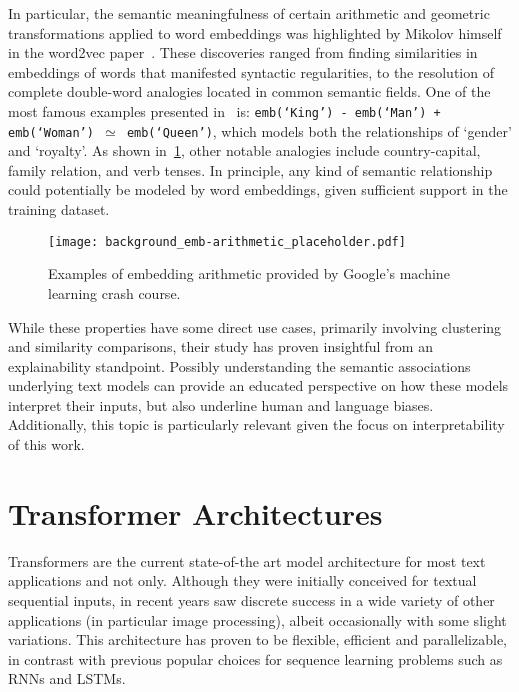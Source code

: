 In particular, the semantic meaningfulness of certain arithmetic and geometric transformations applied to word embeddings was highlighted by Mikolov himself in the word2vec paper~\cite{mikolov2013}.
These discoveries ranged from finding similarities in embeddings of words that manifested syntactic regularities, to the resolution of complete double-word analogies located in common semantic fields.
One of the most famous examples presented in~\cite{mikolov2013} is: \texttt{emb(`King') - emb(`Man') + emb(`Woman') $\simeq$ emb(`Queen')}, which models both the relationships of `gender' and `royalty'. %
As shown in~\cref{fig:background_emb-arithmetic}, other notable analogies include country-capital, family relation, and verb tenses.
In principle, any kind of semantic relationship could potentially be modeled by word embeddings, given sufficient support in the training dataset.

\begin{figure}[t!]
    \centering
    \texttt{[image: background\_emb-arithmetic\_placeholder.pdf]}
    \caption[Examples of embedding arithmetic provided by Google's machine learning crash course]{Examples of embedding arithmetic provided by Google's machine learning crash course\footnotemark.}
    \label{fig:background_emb-arithmetic}
\end{figure}

While these properties have some direct use cases, primarily involving clustering and similarity comparisons, their study has proven insightful from an explainability standpoint.
Possibly understanding the semantic associations underlying text models can provide an educated perspective on how these models interpret their inputs, but also underline human and language biases.
Additionally, this topic is particularly relevant given the focus on interpretability of this work.

\section{Transformer Architectures}

Transformers are the current state-of-the art model architecture for most text applications and not only.
Although they were initially conceived for textual sequential inputs, in recent years saw discrete success in a wide variety of other applications (in particular image processing), albeit occasionally with some slight variations.
This architecture has proven to be flexible, efficient and parallelizable, in contrast with previous popular choices for sequence learning problems such as RNNs and LSTMs.

